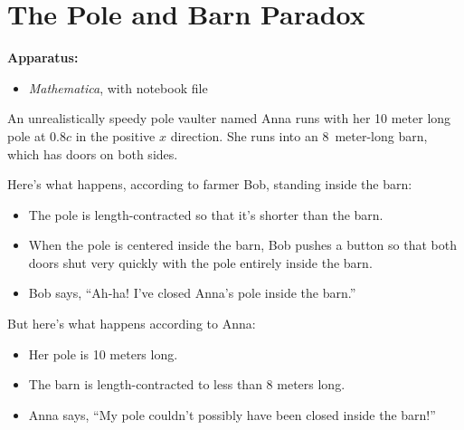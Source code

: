 \section{The Pole and Barn Paradox}

\makelabheader %


\medskip
\textbf{Apparatus:}
\begin{itemize}[nosep]
\item \textit{Mathematica}, with notebook file 
\end{itemize}

\medskip

An unrealistically speedy pole vaulter named Anna runs with her 10 meter long pole at $0.8 c$ in the positive $x$ direction. She runs into an 8~meter-long barn, which has doors on both sides.  

Here's what happens, according to farmer Bob, standing inside the barn:
\begin{itemize}[nosep]
\item The pole is length-contracted so that it's shorter than the barn.
\item When the pole is centered inside the barn, Bob pushes a button so that both doors shut very quickly with the pole entirely inside the barn.
\item Bob says, ``Ah-ha! I've closed Anna's pole inside the barn.''
\end{itemize}

But here's what happens according to Anna:
\begin{itemize}[nosep]
\item Her pole is 10 meters long.
\item The barn is length-contracted to less than 8 meters long.
\item Anna says, ``My pole couldn't possibly have been closed inside the barn!''
\end{itemize}


